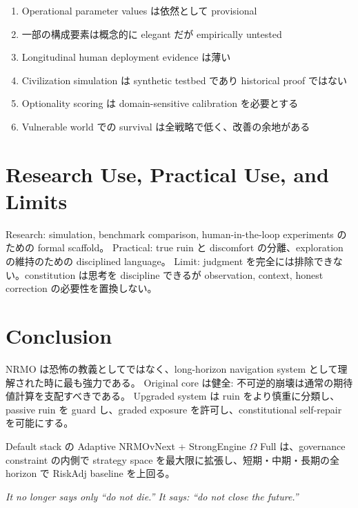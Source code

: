 \documentclass[11pt,a4paper]{article}
\theoremstyle{definition}\newtheorem{definition}{Definition}[section]
\begin{document}
\begin{enumerate}[leftmargin=2em]
  \item Operational parameter values は依然として provisional
  \item 一部の構成要素は概念的に elegant だが empirically untested
  \item Longitudinal human deployment evidence は薄い
  \item Civilization simulation は synthetic testbed であり historical proof ではない
  \item Optionality scoring は domain-sensitive calibration を必要とする
  \item Vulnerable world での survival は全戦略で低く、改善の余地がある
\end{enumerate}


\section{Research Use, Practical Use, and Limits}

Research: simulation, benchmark comparison, human-in-the-loop experiments のための formal scaffold。
Practical: true ruin と discomfort の分離、exploration の維持のための disciplined language。
Limit: judgment を完全には排除できない。constitution は思考を discipline できるが observation, context, honest correction の必要性を置換しない。


\section{Conclusion}

NRMO は恐怖の教義としてではなく、long-horizon navigation system として理解された時に最も強力である。
Original core は健全: 不可逆的崩壊は通常の期待値計算を支配すべきである。
Upgraded system は ruin をより慎重に分類し、passive ruin を guard し、graded exposure を許可し、constitutional self-repair を可能にする。

Default stack の Adaptive NRMOvNext + StrongEngine $\Omega$ Full は、governance constraint の内側で strategy space を最大限に拡張し、短期・中期・長期の全 horizon で RiskAdj baseline を上回る。

\textit{It no longer says only ``do not die.'' It says: ``do not close the future.''}


\appendix
\end{document}

